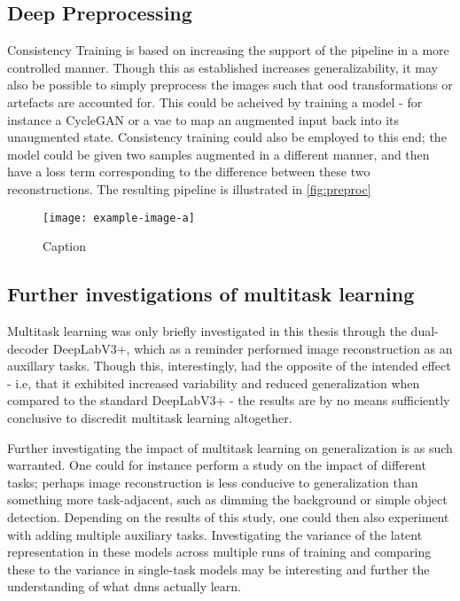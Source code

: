     \subsection{Deep Preprocessing}
        Consistency Training is based on increasing the support of the pipeline in a more controlled manner. Though this as established increases generalizability, it may also be possible to simply preprocess the images such that \gls{ood} transformations or artefacts are accounted for. This could be acheived by training a model - for instance a CycleGAN or a \gls{vae} to map an augmented input back into its unaugmented state. Consistency training could also be employed to this end; the model could be given two samples augmented in a different manner, and then have a loss term corresponding to the difference between these two reconstructions. The resulting pipeline is illustrated in \autoref{fig:preproc}
        
        \begin{figure}
            \centering
            \texttt{[image: example-image-a]}
            \caption{Caption}
            \label{fig:preproc}
        \end{figure}
    
    \subsection{Further investigations of multitask learning}
        Multitask learning was only briefly investigated in this thesis through the dual-decoder DeepLabV3+, which as a reminder performed image reconstruction as an auxillary tasks. Though this, interestingly, had the opposite of the intended effect - i.e, that it exhibited increased variability and reduced generalization when compared to the standard DeepLabV3+ - the results are by no means sufficiently conclusive to discredit multitask learning altogether. 
    
        Further investigating the impact of multitask learning on generalization is as such warranted. One could for instance perform a study on the impact of different tasks; perhaps image reconstruction is less conducive to generalization than something more task-adjacent, such as dimming the background or simple object detection. Depending on the results of this study, one could then also experiment with adding multiple auxiliary tasks. Investigating the variance of the latent representation in these models across multiple runs of training and comparing these to the variance in single-task models may be interesting and further the understanding of what \glspl{dnn} actually learn.
    
